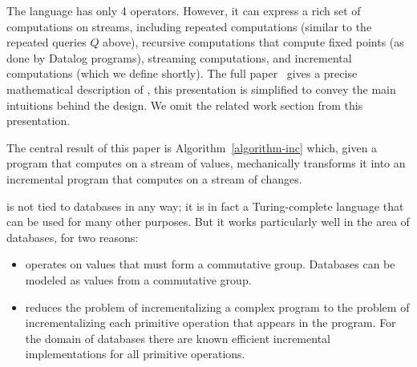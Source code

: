 
The \dbsp language has only 4 operators.  However, it can express a
rich set of computations on streams, including repeated computations
(similar to the repeated queries $Q$ above), recursive computations
that compute fixed points (as done by Datalog programs), streaming
computations, and incremental computations (which we define shortly).
The full paper~\cite{budiu-vldb23} gives a precise mathematical
description of \dbsp, this presentation is simplified to convey the
main intuitions behind the design.  We omit the related work section
from this presentation.

The central result of this paper is Algorithm~\ref{algorithm-inc}
which, given a \dbsp program that computes on a stream of values,
mechanically transforms it into an incremental \dbsp program that
computes on a stream of changes.

\dbsp is not tied to databases in any way; it is in fact a
Turing-complete language that can be used for many other purposes.
But it works particularly well in the area of databases, for two
reasons:

\begin{itemize}
  \item \dbsp operates on values that must form a commutative group.
    Databases can be modeled as values from a commutative group.
  \item \dbsp reduces the problem of incrementalizing a complex
    program to the problem of incrementalizing each primitive
    operation that appears in the program.  For the domain of
    databases there are known efficient incremental implementations
    for all primitive operations.
\end{itemize}

